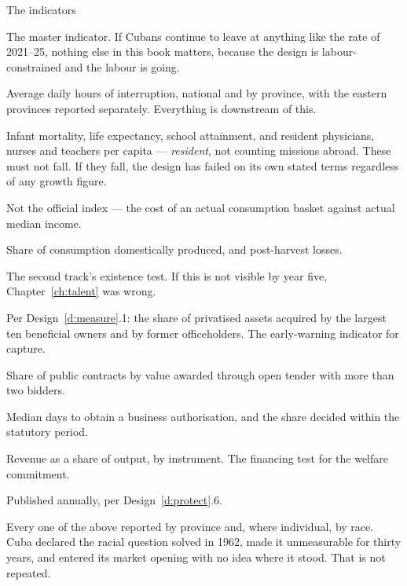 \begin{design}{The indicators}
\label{d:indicators}
\begin{rules}
 The master indicator. If Cubans continue to leave at
anything like the rate of 2021--25, nothing else in this book matters, because
the design is labour-constrained and the labour is going.

 Average daily hours of interruption, national and by
province, with the eastern provinces reported separately. Everything is
downstream of this.

 Infant mortality, life expectancy, school
attainment, and resident physicians, nurses and teachers per capita ---
\emph{resident}, not counting missions abroad. These must not fall. If they fall,
the design has failed on its own stated terms regardless of any growth figure.

 Not the official index --- the
cost of an actual consumption basket against actual median income.

 Share of consumption domestically produced, and post-harvest losses.

 The second track's existence
test. If this is not visible by year five, Chapter~\ref{ch:talent} was wrong.

 Per Design~\ref{d:measure}.1: the share of privatised
assets acquired by the largest ten beneficial owners and by former officeholders.
The early-warning indicator for capture.

 Share of public contracts by value awarded
through open tender with more than two bidders.

 Median days to obtain a business authorisation, and
the share decided within the statutory period.

 Revenue as a share of output, by instrument. The financing
test for the welfare commitment.

 Published annually, per
Design~\ref{d:protect}.6.

 Every one of the above reported by province and, where
individual, by race. Cuba declared the racial question solved in 1962, made it
unmeasurable for thirty years, and entered its market opening with no idea where
it stood. That is not repeated.
\end{rules}
\end{design}

